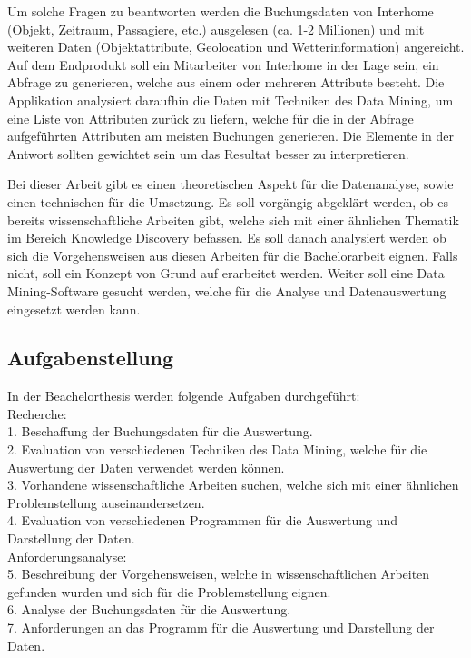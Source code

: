Um solche Fragen zu beantworten werden die Buchungsdaten von Interhome (Objekt, Zeitraum, Passagiere, etc.) ausgelesen (ca. 1-2 Millionen) und mit weiteren Daten (Objektattribute, Geolocation und Wetterinformation) angereicht. 
Auf dem Endprodukt soll ein Mitarbeiter von Interhome in der Lage sein, ein Abfrage zu generieren, welche aus einem oder mehreren Attribute besteht. Die Applikation analysiert daraufhin die Daten mit Techniken des Data Mining, um eine Liste von Attributen zurück zu liefern, welche für die in der Abfrage aufgeführten Attributen am meisten Buchungen generieren. Die Elemente in der Antwort sollten gewichtet sein um das Resultat besser zu interpretieren.

Bei dieser Arbeit gibt es einen theoretischen Aspekt für die Datenanalyse, sowie einen technischen für die Umsetzung. 
Es soll vorgängig abgeklärt werden, ob es bereits wissenschaftliche Arbeiten gibt, welche sich mit einer ähnlichen Thematik im Bereich Knowledge Discovery befassen. Es soll danach analysiert werden ob sich die Vorgehensweisen aus diesen Arbeiten für die Bachelorarbeit eignen. Falls nicht, soll ein Konzept von Grund auf erarbeitet werden. Weiter soll eine Data Mining-Software gesucht werden, welche für die Analyse und Datenauswertung eingesetzt werden kann.

\subsection{Aufgabenstellung}
In der Beachelorthesis werden folgende Aufgaben durchgeführt:\\

\noindent Recherche:\\
1. Beschaffung der Buchungsdaten für die Auswertung.\\
2. Evaluation von verschiedenen Techniken des Data Mining, welche für die Auswertung der Daten verwendet werden können.\\
3. Vorhandene wissenschaftliche Arbeiten suchen, welche sich mit einer ähnlichen Problemstellung auseinandersetzen.\\
4. Evaluation von verschiedenen Programmen für die Auswertung und Darstellung der Daten.\\

\noindent Anforderungsanalyse:\\
5. Beschreibung der Vorgehensweisen, welche in wissenschaftlichen Arbeiten gefunden wurden und sich für die Problemstellung eignen. \\
6. Analyse der Buchungsdaten für die Auswertung.\\
7. Anforderungen an das Programm für die Auswertung und Darstellung der Daten.\\

